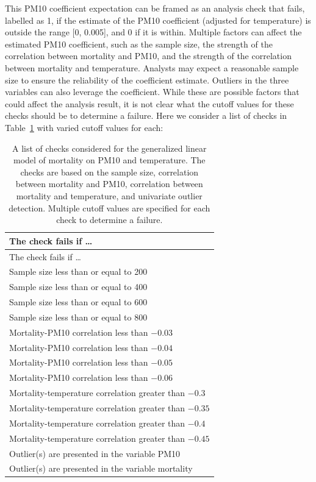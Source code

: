 \documentclass[
  12pt,
]{interact}
\begin{document}
This PM10 coefficient expectation can be framed as an analysis check
that fails, labelled as 1, if the estimate of the PM10 coefficient
(adjusted for temperature) is outside the range {[}0, 0.005{]}, and 0 if
it is within. Multiple factors can affect the estimated PM10
coefficient, such as the sample size, the strength of the correlation
between mortality and PM10, and the strength of the correlation between
mortality and temperature. Analysts may expect a reasonable sample size
to ensure the reliability of the coefficient estimate. Outliers in the
three variables can also leverage the coefficient. While these are
possible factors that could affect the analysis result, it is not clear
what the cutoff values for these checks should be to determine a
failure. Here we consider a list of checks in Table~\ref{tbl-checks}
with varied cutoff values for each:

\begin{longtable}[]{@{}l@{}}
\caption{A list of checks considered for the generalized linear model of
mortality on PM10 and temperature. The checks are based on the sample
size, correlation between mortality and PM10, correlation between
mortality and temperature, and univariate outlier detection. Multiple
cutoff values are specified for each check to determine a
failure.}\label{tbl-checks}\tabularnewline
\toprule\noalign{}
The check fails if \ldots{} \\
\midrule\noalign{}
\endfirsthead
\toprule\noalign{}
The check fails if \ldots{} \\
\midrule\noalign{}
\endhead
\bottomrule\noalign{}
\endlastfoot
Sample size less than or equal to 200 \\
Sample size less than or equal to 400 \\
Sample size less than or equal to 600 \\
Sample size less than or equal to 800 \\
Mortality-PM10 correlation less than \(-0.03\) \\
Mortality-PM10 correlation less than \(-0.04\) \\
Mortality-PM10 correlation less than \(-0.05\) \\
Mortality-PM10 correlation less than \(-0.06\) \\
Mortality-temperature correlation greater than \(-0.3\) \\
Mortality-temperature correlation greater than \(-0.35\) \\
Mortality-temperature correlation greater than \(-0.4\) \\
Mortality-temperature correlation greater than \(-0.45\) \\
Outlier(s) are presented in the variable PM10 \\
Outlier(s) are presented in the variable mortality \\
\end{longtable}
\end{document}
